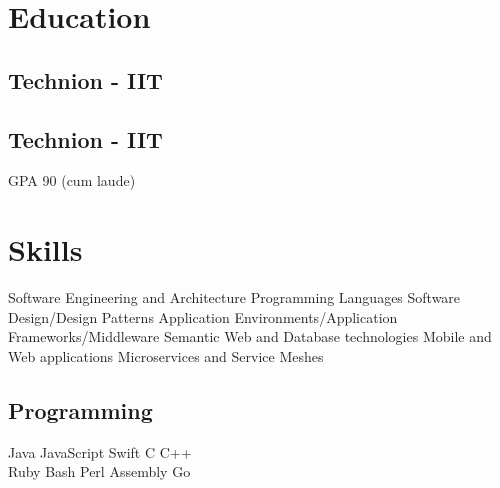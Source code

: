 \documentclass[]{deedy-resume}
\begin{document}
%
%

%
%


%
%

\begin{minipage}[t]{0.33\textwidth}


\section{Education}

\subsection{Technion - IIT}
\sectionsep
\subsection{Technion - IIT}
GPA 90 (cum laude)
\sectionsep


\section{Skills}
Software Engineering and Architecture \textbullet{} Programming Languages \textbullet{} Software Design/Design Patterns \textbullet{} Application Environments/Application Frameworks/Middleware \textbullet{} Semantic Web and Database technologies \textbullet{} Mobile and Web applications \textbullet{} Microservices and Service Meshes
\sectionsep

\subsection{Programming}
Java \textbullet{} JavaScript \textbullet{} Swift \textbullet{} C \textbullet{}  C++ \\
Ruby  \textbullet{}  Bash \textbullet{}  Perl \textbullet{} Assembly \textbullet{} Go
\sectionsep


\end{minipage}
\end{document}
